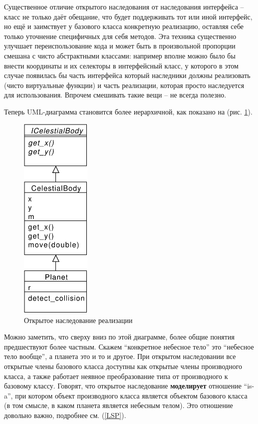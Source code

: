 \documentclass[a4paper,12pt,oneside]{article}
\begin{document}
Существенное отличие открытого наследования от наследования интерфейса -- класс не только даёт обещание, что будет поддерживать тот или иной интерфейс, но ещё и заимствует у базового класса конкретную реализацию, оставляя себе только уточнение специфичных для себя методов. Эта техника существенно улучшает переиспользование кода и может быть в произвольной пропорции смешана с чисто абстрактными классами: например вполне можно было бы внести координаты и их селекторы в интерфейсный класс, у которого в этом случае появилась бы часть интерфейса который наследники должны реализовать (чисто виртуальные функции) и часть реализации, которая просто наследуется для использования. Впрочем смешивать такие вещи -- не всегда полезно.

Теперь UML-диаграмма становится более иерархичной, как показано на (рис. \ref{fig:inheritance-implementation}).

\begin{figure}[h!]
\centering
\includegraphics[width=0.3\textwidth]{illustrations/impl-inheritance-crop.pdf}
\caption{Открытое наследование реализации}
\label{fig:inheritance-implementation}
\end{figure}

Можно заметить, что сверху вниз по этой диаграмме, более общие понятия предшествуют более частным. Скажем ``конкретное небесное тело'' это ``небесное тело вообще'', а планета это и то и другое. При открытом наследовании все открытые члены базового класса доступны как открытые члены производного класса, а также работает неявное преобразование типа от производного к базовому классу. Говорят, что открытое наследование \textbf{моделирует} отношение ``is-a'', при котором объект производного класса является объектом базового класса (в том смысле, в каком планета является небесным телом). Это отношение довольно важно, подробнее см. (\ref{LSP}).
\end{document}
